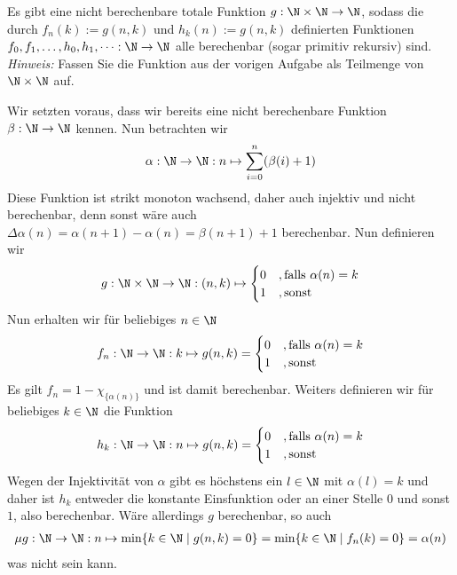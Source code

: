 
\begin{exercise}[200]

Es gibt eine nicht berechenbare totale Funktion $g: \N \times \N \to \N$, sodass
die durch $f_n(k) := g(n,k)$ und $h_k(n) := g(n,k)$ definierten Funktionen
$f_0,f_1,\dots,h_0,h_1,\dots: \N \to \N$ alle berechenbar (sogar primitiv rekursiv) sind. \\
\textit{Hinweis:} Fassen Sie die Funktion aus der vorigen Aufgabe als Teilmenge von
$\N \times \N$ auf.

\end{exercise}


\begin{solution}

	Wir setzten voraus, dass wir bereits eine nicht berechenbare Funktion $\beta: \N \to \N$ kennen. Nun betrachten wir
	\begin{align*}
	\alpha: \N \to \N: n \mapsto \sum_{i = 0}^n (\beta(i) + 1)
	\end{align*}
	Diese Funktion ist strikt monoton wachsend, daher auch injektiv und nicht berechenbar, denn sonst wäre auch $\Delta\alpha(n) = \alpha(n + 1) - \alpha(n) = \beta(n+1) + 1$ berechenbar. Nun definieren wir
	\begin{align*}
	g: \N \times \N \to \N : (n, k) \mapsto
	\begin{cases}
	0 &, \text{falls }\alpha(n) = k \\
	1 &, \text{sonst}
	\end{cases}
	\end{align*}
	Nun erhalten wir für beliebiges $n \in \N$
	\begin{align*}
	f_n: \N \to \N : k \mapsto g(n,k) =
	\begin{cases}
	0 &, \text{falls } \alpha(n) = k \\
	1 &, \text{sonst}
	\end{cases}
	\end{align*}
	Es gilt $f_n = 1 - \chi_{\{\alpha(n)\}}$ und ist damit berechenbar. Weiters definieren wir für beliebiges $k \in \N$ die Funktion
	\begin{align*}
	h_k: \N \to \N : n \mapsto g(n,k) =
	\begin{cases}
	0 &, \text{falls } \alpha(n) = k \\
	1 &, \text{sonst}
	\end{cases}
	\end{align*}
	Wegen der Injektivität von $\alpha$ gibt es höchstens ein $l \in \N$ mit $\alpha(l) = k$ und daher ist $h_k$ entweder die konstante Einsfunktion oder an einer Stelle $0$ und sonst $1$, also berechenbar.
	Wäre allerdings $g$ berechenbar, so auch
	\begin{align*}
	\mu g:  \N \to \N: n \mapsto \min\{k \in \N \mid g(n,k) = 0\} = \min\{k \in \N \mid f_n(k) = 0\} = \alpha(n)
	\end{align*}
	was nicht sein kann.
\end{solution}
